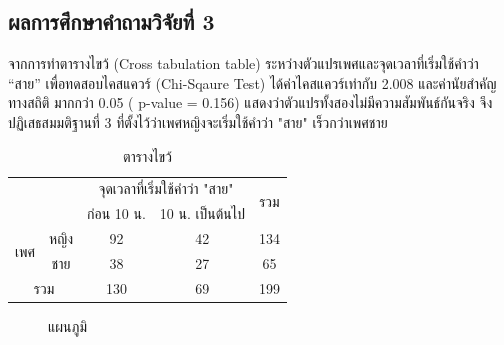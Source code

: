 \documentclass[a4paper]{article}
\begin{document}
\subsection{ผลการศึกษาคำถามวิจัยที่ 3}
    จากการทำตารางไขว้ (Cross tabulation table) ระหว่างตัวแปรเพศและจุดเวลาที่เริ่มใช้คำว่า “สาย” เพื่อทดสอบไคสแควร์ (Chi-Sqaure Test) ได้ค่าไคสแควร์เท่ากับ  2.008 และค่านัยสำคัญทางสถิติ มากกว่า 0.05 ( p-value = 0.156) แสดงว่าตัวแปรทั้งสองไม่มีความสัมพันธ์กันจริง จึงปฏิเสธสมมติฐานที่ 3 ที่ตั้งไว้ว่าเพศหญิงจะเริ่มใช้คำว่า "สาย" เร็วกว่าเพศชาย
    \begin{table}[!ht]
        \begin{center}
        \begin{tabular}{|c|c|c|c|c|}
            \cline{3-5}
            \multicolumn{2}{c|}{} & \multicolumn{2}{c|}{จุดเวลาที่เริ่มใช้คำว่า "สาย"} & \multirow{2}{*}{รวม} \\
            \cline{3-4}
            \multicolumn{2}{c|}{} & ก่อน 10 น. & 10 น. เป็นต้นไป & \\
            \hline
            \multirow{2}{*}{เพศ} & หญิง & 92 & 42 & 134 \\
            \cline{2-5}
            & ชาย & 38 & 27 & 65 \\
            \hline
            \multicolumn{2}{|c|}{รวม} & 130 & 69 & 199 \\
            \hline
        \end{tabular}
        \end{center}
        \caption{ตารางไขว้}
    \end{table}
    \begin{figure}[!ht]
        \begin{center}
        \end{center}
        \caption{แผนภูมิ}
    \end{figure}
\end{document}
